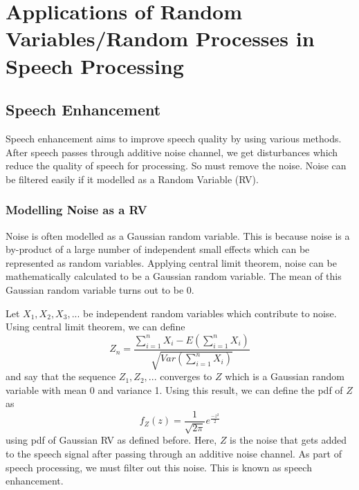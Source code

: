 \documentclass[10pt,twocolumn,letterpaper]{article}
\begin{document}

\section{\textbf{Applications of Random Variables/Random Processes in Speech Processing}}


\subsection{Speech Enhancement}
Speech enhancement aims to improve speech quality by using various methods. After speech passes through additive noise channel, we get disturbances which reduce the quality of speech for processing. So must remove the noise. Noise can be filtered easily if it modelled as a Random Variable (RV).


\subsubsection{Modelling Noise as a RV}
Noise is often modelled as a Gaussian random variable. This is because noise is a by-product of a large number of independent small effects which can be represented as random variables. Applying central limit theorem, noise can be mathematically calculated to be a Gaussian random variable. The mean of this Gaussian random variable turns out to be 0.

\par Let $X_1, X_2, X_3, ...$ be independent random variables which contribute to noise. Using central limit theorem, we can define $$Z_n = \frac{\sum_{i=1}^nX_i-E(\sum_{i=1}^nX_i)}{\sqrt{Var(\sum_{i=1}^nX_i)}}$$
and say that the sequence $Z_1, Z_2, ...$ converges to $Z$ which is a Gaussian random variable with mean 0 and variance 1. Using this result, we can define the pdf of $Z$ as $$f_Z(z) = \frac{1}{\sqrt{2\pi}}e^{\frac{-z^2}{2}}$$ using pdf of Gaussian RV as defined before. Here, $Z$ is the noise that gets added to the speech signal after passing through an additive noise channel. As part of speech processing, we must filter out this noise. This is known as speech enhancement. 

\end{document}
